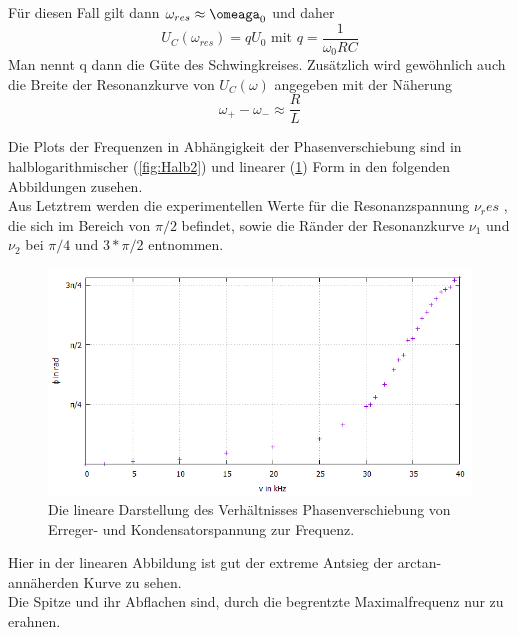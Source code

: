 \documentclass{scrartcl}
\begin{document}
           Für diesen Fall gilt dann $\omega_{res} \approx \omeaga_0$ und daher
           \begin{equation}
               \label{eqn:Güte}
               U_C(\omega_{res})= qU_0
               \text { mit }
                q=\frac{1}{\omega_0 RC}
           \end{equation}
           Man nennt q dann die Güte des Schwingkreises. Zusätzlich wird gewöhnlich auch die Breite der Resonanzkurve von $U_C(\omega)$ angegeben
           mit der Näherung
           \begin{equation}
               \label{eqn:Breite}
               \omega_+ -\omega_- \approx \frac{R}{L}
           \end{equation}

     Die Plots der Frequenzen in Abhängigkeit der Phasenverschiebung sind in halblogarithmischer (\ref{fig:Halb2}) und linearer (\ref{fig:Linear2}) Form in den folgenden Abbildungen zusehen.\\
     Aus Letztrem werden die experimentellen Werte für die Resonanzspannung $\nu_res$ , die sich im Bereich von $\pi/2$ befindet, sowie die Ränder der Resonanzkurve $\nu_1$ und $\nu_2$ bei $\pi/4$ und $3*\pi/2$ entnommen.
     \begin{figure}
       \centering
       \includegraphics[width=\textwidth]{Linear2.jpeg}
       \caption{Die lineare Darstellung des Verhältnisses Phasenverschiebung von Erreger- und Kondensatorspannung zur Frequenz.}
       \label{fig:Linear2}
     \end{figure}
     Hier in der linearen Abbildung ist gut der extreme Antsieg der arctan-annäherden Kurve zu sehen.\\Die Spitze und ihr Abflachen sind, durch die begrentzte Maximalfrequenz nur zu erahnen.
\end{document}
